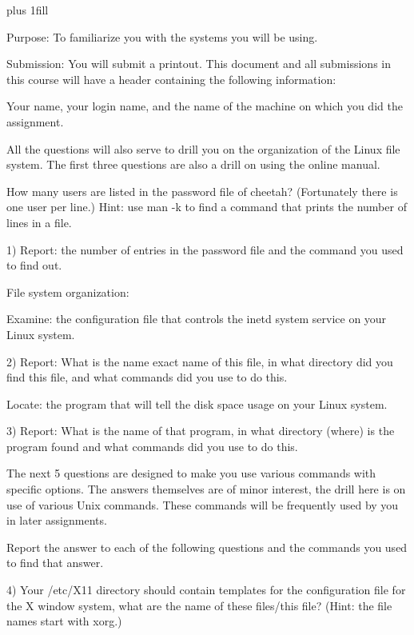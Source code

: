 
\rightskip=0pt plus 1fill

\parindent 0pt

Purpose:
To familiarize you with the systems you will be using.

Submission: You will submit a printout.
This document and all submissions in this course will have a header
containing the following information:

Your name, your login name, and the name of the machine on which you
did the assignment.

All the questions will also serve to drill you on the organization
of the Linux file system.
The first three questions are also a drill on using the online manual.

How many users are listed in the password file of cheetah?
(Fortunately there is one user per line.)
Hint: use {\ltt{}man -k} to find a command that prints the number
of lines in a file.

1) Report: the number of entries in the password file and
the command you used to find out.

File system organization:

Examine: the configuration file that controls the {\ltt{}inetd} system service
on your Linux system.

2) Report: 
What is the name exact name of this file,
in what directory did you find this file,
and what commands did you use to do this.

Locate: the program that will tell the disk space usage
on your Linux system.

3) Report: What is the name of that program,
in what directory (where) is the program found
and what commands did you use to do this.

The next 5 questions are designed to make you use various
commands with specific options.
The answers themselves are of minor interest, the drill here is
on use of various Unix commands.
These commands will be frequently used by you in later assignments.

Report the answer to each of the following questions and the
commands you used to find that answer.

4) Your {\ltt{}/etc/X11} directory should contain templates for
the configuration file for the {\ltt{}X} window system,
what are the name of these files/this file?
(Hint: the file names start with xorg.)

